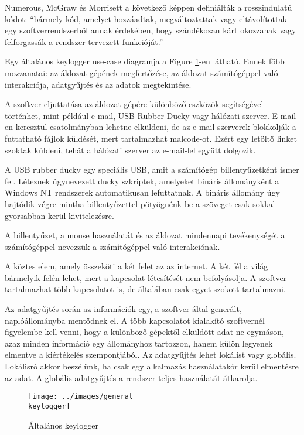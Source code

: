 \documentclass[a4paper, 11pt]{article}
\begin{document}
Numerous, McGraw és Morrisett a következő képpen definiálták a rosszindulatú kódot: \cite{ahmed2014survey} ``bármely kód, amelyet hozzáadtak, megváltoztattak vagy eltávolítottak egy szoftverrendszerből annak érdekében, hogy szándékozan kárt okozzanak vagy felforgassák a rendszer tervezett funkcióját.''

Egy általános keylogger use-case diagramja a Figure \ref{fig:genkeylogger}-en látható. Ennek főbb mozzanatai: az áldozat gépének megfertőzése, az áldozat számítógéppel való interakciója, adatgyűjtés és az adatok megtekintése.

A szoftver eljuttatása az áldozat gépére különböző eszközök segítségével történhet, mint például e-mail, USB Rubber Ducky vagy hálózati szerver. E-mail-en keresztül csatolmányban lehetne elküldeni, de az e-mail szerverek blokkolják a futtatható fájlok küldését, mert tartalmazhat malcode-ot. Ezért egy letöltő linket szoktak küldeni, tehát a hálózati szerver az e-mail-lel együtt dolgozik.

A USB rubber ducky egy speciális USB, amit a számítógép billentyűzetként ismer fel. Léteznek úgynevezett ducky szkriptek, amelyeket bináris állományként a Windows NT rendszerek automatikusan lefuttatnak. A bináris állomány úgy hajtódik végre mintha billentyűzettel pötyögnénk be a szöveget csak sokkal gyorsabban kerül kivitelezésre.

A billentyűzet, a mouse használatát és az áldozat mindennapi tevékenységét a számítógéppel nevezzük a számítógéppel való interakciónak.

A köztes elem, amely összeköti a két felet az az internet. A két fél a világ bármelyik felén lehet, mert a kapcsolat létesítését nem befolyásolja. A szoftver tartalmazhat több kapcsolatot is, de általában csak egyet szokott tartalmazni.

Az adatgyűjtés során az információk egy, a szoftver által generált, naplóállományba mentődnek el. A több kapcsolatot kialakító szoftvernél figyelembe kell venni, hogy a különböző gépektől elküldött adat ne egymáson, azaz minden információ egy állományhoz tartozzon, hanem külön legyenek elmentve a kiértékelés szempontjából. Az adatgyűjtés lehet lokálist vagy globális. Lokálisró akkor beszélünk, ha csak egy alkalmazás használatakór kerül elmentésre az adat. A globális adatgyűjtés a rendszer teljes használatát átkarolja.

\begin{figure}[H]
\centering
\texttt{[image: ../images/general\\ keylogger]}
\caption{Általános keylogger}
\label{fig:genkeylogger}
\end{figure}
\end{document}
